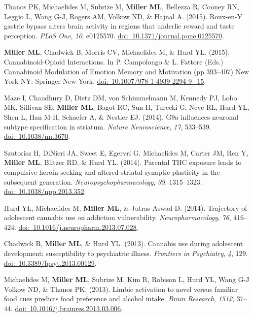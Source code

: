 \documentclass[10pt]{article}
\begin{document}
\begin{description}
\item Thanos PK, Michaelides M, Subrize M, \textbf{Miller ML}, Bellezza R, Cooney RN, Leggio L, Wang G-J, Rogers AM, Volkow ND, \& Hajnal A. (2015). Roux-en-Y gastric bypass alters brain activity in regions that underlie reward and taste perception. \textit{PLoS One}, \textit{10}, e0125570. \href{https://doi.org/10.1371/journal.pone.0125570}{doi:~10.1371/journal.pone.0125570}.
\item \textbf{Miller ML}, Chadwick B, Morris CV, Michaelides M, \& Hurd YL. (2015). Cannabinoid-Opioid Interactions. In P. Campolongo \& L. Fattore (Eds.) Cannabinoid Modulation of Emotion Memory and Motivation (pp 393--407) New York NY: Springer New York. \href{https://doi.org/10.1007/978-1-4939-2294-9_15}{doi:~10.1007/978-1-4939-2294-9\_15}.
\item Maze I, Chaudhury D, Dietz DM, von Schimmelmann M, Kennedy PJ, Lobo MK, Sillivan SE, \textbf{Miller ML}, Bagot RC, Sun H, Turecki G, Neve RL, Hurd YL, Shen L, Han M-H, Schaefer A, \& Nestler EJ. (2014). G9a influences neuronal subtype specification in striatum. \textit{Nature Neuroscience}, \textit{17}, 533--539. \href{https://doi.org/10.1038/nn.3670}{doi:~10.1038/nn.3670}.
\item Szutorisz H, DiNieri JA, Sweet E, Egervri G, Michaelides M, Carter JM, Ren Y, \textbf{Miller ML}, Blitzer RD, \& Hurd YL. (2014). Parental THC exposure leads to compulsive heroin-seeking and altered striatal synaptic plasticity in the subsequent generation. \textit{Neuropsychopharmacology}, \textit{39}, 1315--1323. \href{https://doi.org/10.1038/npp.2013.352}{doi:~10.1038/npp.2013.352}.
\item Hurd YL, Michaelides M, \textbf{Miller ML}, \& Jutras-Aswad D. (2014). Trajectory of adolescent cannabis use on addiction vulnerability. \textit{Neuropharmacology}, \textit{76}, 416--424. \href{https://doi.org/10.1016/j.neuropharm.2013.07.028}{doi:~10.1016/j.neuropharm.2013.07.028}.
\item Chadwick B, \textbf{Miller ML}, \& Hurd YL. (2013). Cannabis use during adolescent development: susceptibility to psychiatric illness. \textit{Frontiers in Psychiatry}, \textit{4}, 129. \href{https://doi.org/10.3389/fpsyt.2013.00129}{doi:~10.3389/fpsyt.2013.00129}.
\item Michaelides M, \textbf{Miller ML}, Subrize M, Kim R, Robison L, Hurd YL, Wang G-J Volkow ND, \& Thanos PK. (2013). Limbic activation to novel versus familiar food cues predicts food preference and alcohol intake. \textit{Brain Research}, \textit{1512}, 37--44. \href{https://doi.org/10.1016/j.brainres.2013.03.006}{doi:~10.1016/j.brainres.2013.03.006}.

\end{description}
\end{document}
